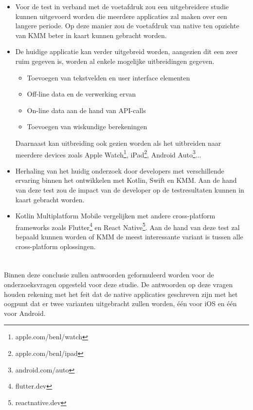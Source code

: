 \begin{itemize}
    \item Voor de test in verband met de voetafdruk zou een uitgebreidere studie kunnen uitgevoerd worden die meerdere applicaties  zal maken over een langere periode. Op deze manier zou de voetafdruk van native ten opzichte van KMM beter in kaart kunnen gebracht worden.
    
    \item De huidige applicatie kan verder uitgebreid worden, aangezien dit een zeer ruim gegeven is, worden al enkele mogelijke uitbreidingen gegeven.
    \begin{itemize}
        \item Toevoegen van tekstvelden en user interface elementen
        \item Off-line data en de verwerking ervan
        \item On-line data aan de hand van API-calls
        \item Toevoegen van wiskundige berekeningen
    \end{itemize}
    
    Daarnaast kan uitbreiding ook gezien worden als het uitbreiden naar meerdere devices zoals Apple Watch\footnote{apple.com/benl/watch}, iPad\footnote{apple.com/benl/ipad}, Android Auto\footnote{android.com/auto}... 
    
    \item Herhaling van het huidig onderzoek door developers met verschillende ervaring binnen het ontwikkelen met Kotlin, Swift en KMM. Aan de hand van deze test zou de impact van de developer op de testresultaten kunnen in kaart gebracht worden.
    
    \item Kotlin Multiplatform Mobile vergelijken met andere cross-platform frameworks zoals Flutter\footnote{flutter.dev} en React Native\footnote{reactnative.dev}. Aan de hand van deze test zal bepaald kunnen worden of KMM de meest interessante variant is tussen alle cross-platform oplossingen.
\end{itemize}


\section{}
\label{sec:C-algemene-conclusie}    
Binnen deze conclusie zullen antwoorden geformuleerd worden voor de onderzoeksvragen opgesteld voor deze studie. De antwoorden op deze vragen houden rekening met het feit dat de native applicaties geschreven zijn met het oogpunt dat er twee varianten uitgebracht zullen worden, één voor iOS en één voor Android.

